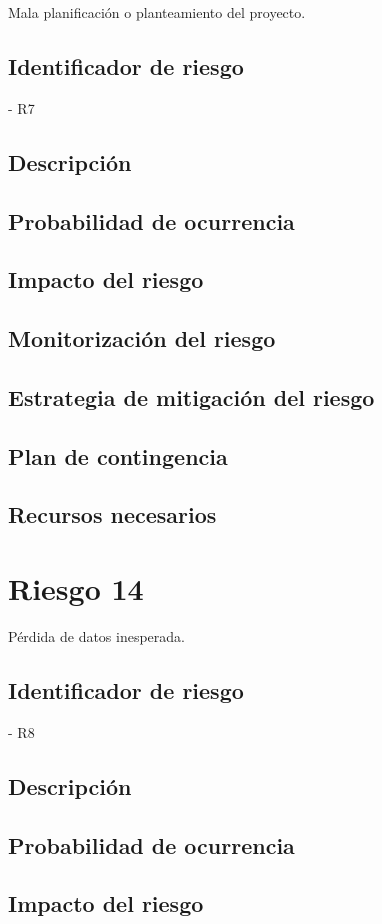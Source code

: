 Mala planificación o planteamiento del proyecto.

\subsection{Identificador de riesgo}
- R7
\subsection{Descripción}
\subsection{Probabilidad de ocurrencia}
\subsection{Impacto del riesgo}
\subsection{Monitorización del riesgo}
\subsection{Estrategia de mitigación del riesgo}
\subsection{Plan de contingencia}
\subsection{Recursos necesarios}

\section{Riesgo 14}

Pérdida de datos inesperada.

\subsection{Identificador de riesgo}
- R8
\subsection{Descripción}
\subsection{Probabilidad de ocurrencia}
\subsection{Impacto del riesgo}

